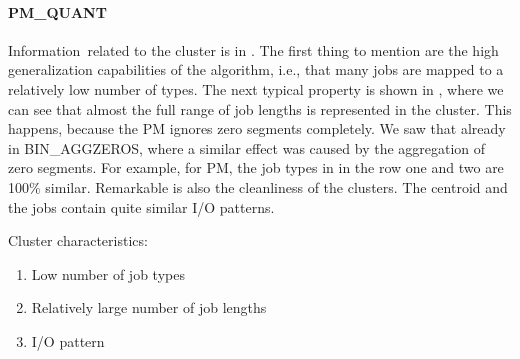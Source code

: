 \documentclass{jhps}
\begin{document}
\paragraph{PM\_QUANT}
Information\ related to the cluster is in .
The first thing to mention are the high generalization capabilities of the algorithm, i.e., that many jobs are mapped to a relatively low number of types.
The next typical property is shown in , where we can see that almost the full range of job lengths is represented in the cluster.
This happens, because the PM ignores zero segments completely.
We saw that already in BIN\_AGGZEROS, where a similar effect was caused by the aggregation of zero segments.
For example, for PM, the job types in  in the row one and two are 100$\%$  similar.
Remarkable is also the cleanliness of the clusters.
The centroid and the jobs contain quite similar I/O patterns.

Cluster characteristics:
\begin{enumerate}
 \item Low number of job types
 \item Relatively large number of job lengths
 \item I/O pattern
\end{enumerate}
\end{document}
